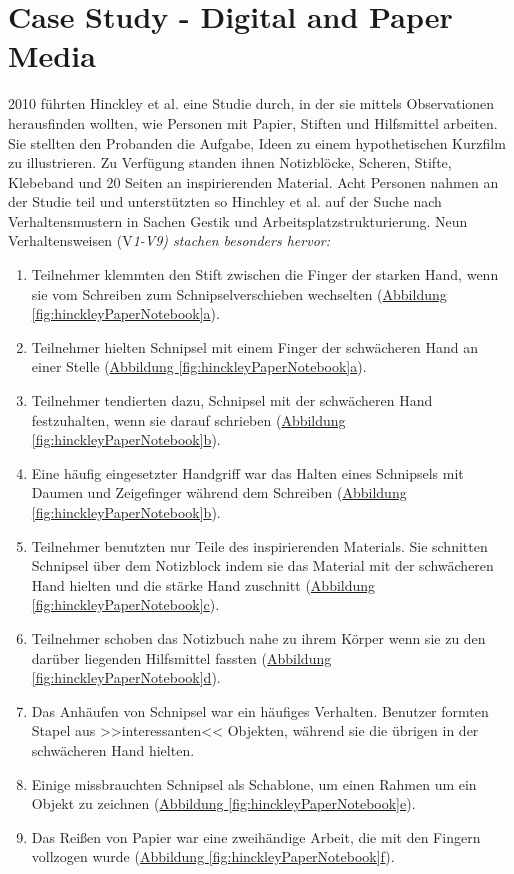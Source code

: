 \section{Case Study - Digital and Paper Media}

2010 führten Hinckley et al. eine Studie durch, in der sie mittels Observationen herausfinden wollten, wie Personen mit Papier, Stiften und Hilfsmittel arbeiten. Sie stellten den Probanden die Aufgabe, Ideen zu einem hypothetischen Kurzfilm zu illustrieren. Zu Verfügung standen ihnen Notizblöcke, Scheren, Stifte, Klebeband und 20 Seiten an inspirierenden Material. Acht Personen nahmen an der Studie teil und unterstützten so Hinchley et al. auf der Suche nach Verhaltensmustern in Sachen Gestik und Arbeitsplatzstrukturierung. Neun Verhaltensweisen (V\itshape 1\upshape-V\itshape 9\upshape) stachen besonders hervor:

\medskip \begin{enumerate}
	\item Teilnehmer klemmten den Stift zwischen die Finger der starken Hand, wenn sie vom Schreiben zum Schnipselverschieben wechselten (\hyperref[fig:hinckleyPaperNotebook]{Abbildung \ref*{fig:hinckleyPaperNotebook}a}).
	\item Teilnehmer hielten Schnipsel mit einem Finger der schwächeren Hand an einer Stelle (\hyperref[fig:hinckleyPaperNotebook]{Abbildung \ref*{fig:hinckleyPaperNotebook}a}).
	\item Teilnehmer tendierten dazu, Schnipsel mit der schwächeren Hand festzuhalten, wenn sie darauf schrieben (\hyperref[fig:hinckleyPaperNotebook]{Abbildung \ref*{fig:hinckleyPaperNotebook}b}).
	\item Eine häufig eingesetzter Handgriff war das Halten eines Schnipsels mit Daumen und Zeigefinger während dem Schreiben (\hyperref[fig:hinckleyPaperNotebook]{Abbildung \ref*{fig:hinckleyPaperNotebook}b}).
	\item Teilnehmer benutzten nur Teile des inspirierenden Materials. Sie schnitten Schnipsel über dem Notizblock indem sie das Material mit der schwächeren Hand hielten und die stärke Hand zuschnitt (\hyperref[fig:hinckleyPaperNotebook]{Abbildung \ref*{fig:hinckleyPaperNotebook}c}).
	\item Teilnehmer schoben das Notizbuch nahe zu ihrem Körper wenn sie zu den darüber liegenden Hilfsmittel fassten (\hyperref[fig:hinckleyPaperNotebook]{Abbildung \ref*{fig:hinckleyPaperNotebook}d}).
	\item Das Anhäufen von Schnipsel war ein häufiges Verhalten. Benutzer formten Stapel aus >>interessanten<< Objekten, während sie die übrigen in der schwächeren Hand hielten.
	\item Einige missbrauchten Schnipsel als Schablone, um einen Rahmen um ein Objekt zu zeichnen (\hyperref[fig:hinckleyPaperNotebook]{Abbildung \ref*{fig:hinckleyPaperNotebook}e}).
	\item Das Reißen von Papier war eine zweihändige Arbeit, die mit den Fingern vollzogen wurde (\hyperref[fig:hinckleyPaperNotebook]{Abbildung \ref*{fig:hinckleyPaperNotebook}f}).
\end{enumerate}

